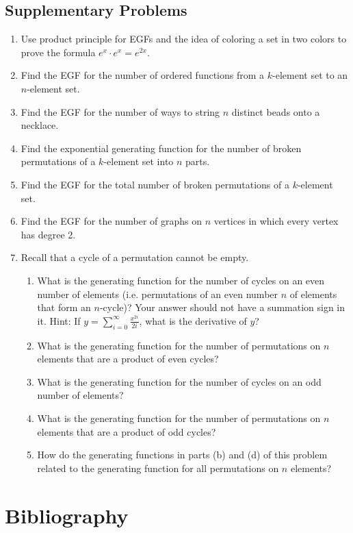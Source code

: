 \documentclass[10pt,]{book}
\theoremstyle{plain}
\theoremstyle{definition}
\numberwithin{equation}{chapter}
\begin{document}
\section[{Supplementary Problems}]{Supplementary Problems}\label{section-31}
\leavevmode%
\begin{enumerate}
\item\hypertarget{li-124}{}Use product principle for EGFs and the idea of coloring a set in two colors to prove the formula \(e^x\cdot e^x = e^{2x}.\)%
\item\hypertarget{li-125}{}Find the EGF for the number of ordered functions from a \(k\)-element set to an \(n\)-element set.%
\item\hypertarget{li-126}{}Find the EGF for the number of ways to string \(n\) distinct beads onto a necklace.%
\item\hypertarget{li-127}{}Find the exponential generating function for the number of broken permutations of a \(k\)-element set into \(n\) parts.%
\item\hypertarget{li-128}{}Find the EGF for the total number of broken permutations of a \(k\)-element set.%
\item\hypertarget{li-129}{}Find the EGF for the number of graphs on \(n\) vertices in which every vertex has degree 2.%
\item\hypertarget{li-130}{}Recall that a cycle of a permutation cannot be empty. %
\begin{enumerate}
\item\hypertarget{li-131}{}What is the generating function for the number of cycles on an even number of elements (i.e. permutations of an even number \(n\) of elements that form an \(n\)-cycle)?  Your answer should not have a summation sign in it.  Hint: If \(y=
\sum_{i=0}^\infty \frac{x^{2i}}{2i}\), what is the derivative of \(y\)?%
\item\hypertarget{li-132}{}What is the generating function for the number of permutations on \(n\) elements that are a product of even cycles?%
\item\hypertarget{li-133}{}What is the generating function for the number of cycles on an odd number of elements?%
\item\hypertarget{li-134}{}What is the generating function for the number of permutations on \(n\) elements that are a product of odd cycles?%
\item\hypertarget{li-135}{}How do the generating functions in parts (b) and (d) of this problem related to the generating function for all permutations on \(n\) elements?%
\end{enumerate}
%
\end{enumerate}
\typeout{************************************************}
\typeout{************************************************}
\chapter[{Bibliography}]{Bibliography}\label{references-1}
%
\renewcommand{\leftmark}{Index}
\printindex
%
\end{document}
